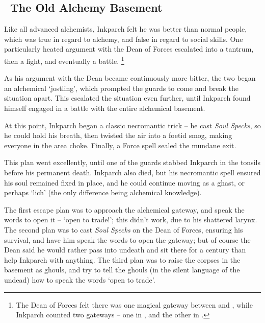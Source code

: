 \subsection[the Old Alchemy Basement]{~The Old Alchemy Basement~}
\label{old_alchemy_basement}


\begin{exampletext}
  \noindent
  Like all advanced alchemists, Inkparch felt he was better than normal people, which was true in regard to alchemy, and false in regard to social skills.
  One particularly heated argument with the Dean of Forces escalated into a tantrum, then a fight, and eventually a battle.%
  \footnote{The Dean of Forces felt there was one magical gateway between  and , while Inkparch counted two gateways -- one in , and the other in .}

  As his argument with the Dean became continuously more bitter, the two began an alchemical `jostling', which prompted the guards to come and break the situation apart.
  This escalated the situation even further, until Inkparch found himself engaged in a battle with the entire alchemical basement.

  At this point, Inkparch began a classic necromantic trick -- he cast \textit{Soul Specks}, so he could hold his breath, then twisted the air into a foetid smog, making everyone in the area choke.
  Finally, a Force \gls{spell} sealed the mundane exit.

  This plan went excellently, until one of the guards stabbed Inkparch in the tonsils before his permanent death.
  Inkparch also died, but his necromantic \gls{spell} ensured his soul remained fixed in place, and he could continue moving as a ghast, or perhaps `lich' (the only difference being alchemical knowledge).

  The first escape plan was to approach the alchemical gateway, and speak the words to open it -- `open to trade!'; this didn't work, due to his shattered larynx.
  The second plan was to cast \textit{Soul Specks} on the Dean of Forces, ensuring his survival, and have him speak the words to open the gateway; but of course the Dean said he would rather pass into undeath and sit there for a century than help Inkparch with anything.
  The third plan was to raise the corpses in the basement as ghouls, and try to tell the ghouls (in the silent language of the undead) how to speak the words `open to trade'.


\end{exampletext}
